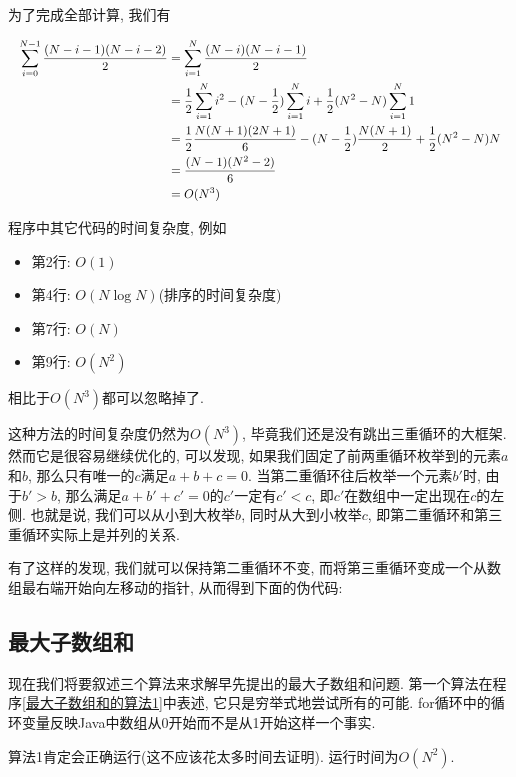 \documentclass[oneside]{ctexbook}
\begin{document}
{为了完成全部计算, 我们有

\begin{equation*}\resizebox{1\textwidth}{!}{$\begin{aligned}
\sum_{i=0}^{N-1}\frac{(N-i-1)(N-i-2)}{2} &= \sum_{i=1}^{N}\frac{(N-i)(N-i-1)}{2} \\
&= \frac{1}{2}\sum_{i=1}^{N}i^2 - (N-\frac{1}{2})\sum_{i=1}^{N}i + \frac{1}{2}(N^2-N)\sum_{i=1}^{N}1 \\
&= \frac{1}{2}\frac{N(N+1)(2N+1)}{6} - (N-\frac{1}{2})\frac{N(N+1)}{2} + \frac{1}{2}(N^2-N)N \\
&= \frac{(N-1)(N^2-2)}{6} \\
&= O(N^3)
\end{aligned}$}\end{equation*}

程序中其它代码的时间复杂度, 例如

\begin{itemize}
    \item 第2行: $O(1)$
    \item 第4行: $O(N\log{N})$(排序的时间复杂度)
    \item 第7行: $O(N)$
    \item 第9行: $O(N^2)$
\end{itemize}

相比于$O(N^3)$都可以忽略掉了.

这种方法的时间复杂度仍然为$O(N^3)$, 毕竟我们还是没有跳出三重循环的大框架. 然而它是很容易继续优化的, 可以发现, 如果我们固定了前两重循环枚举到的元素$a$和$b$, 那么只有唯一的$c$满足$a+b+c=0$. 当第二重循环往后枚举一个元素$b'$时, 由于$b'>b$, 那么满足$a+b'+c'=0$的$c'$一定有$c'<c$, 即$c'$在数组中一定出现在$c$的左侧. 也就是说, 我们可以从小到大枚举$b$, 同时从大到小枚举$c$, 即第二重循环和第三重循环实际上是并列的关系.

有了这样的发现, 我们就可以保持第二重循环不变, 而将第三重循环变成一个从数组最右端开始向左移动的指针, 从而得到下面的伪代码:

\subsection{最大子数组和{}}

现在我们将要叙述三个算法来求解早先提出的最大子数组和问题. 第一个算法在程序\ref{最大子数组和的算法1}中表述, 它只是穷举式地尝试所有的可能. for循环中的循环变量反映Java中数组从0开始而不是从1开始这样一个事实.

算法1肯定会正确运行(这不应该花太多时间去证明). 运行时间为$O(N^2)$.

}
\end{document}
